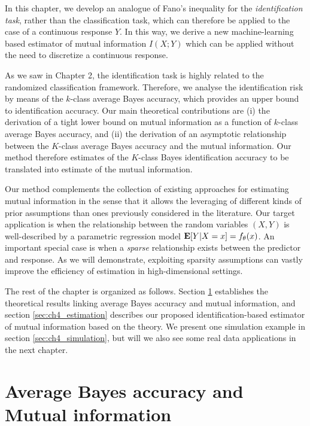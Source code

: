 In this chapter, we develop an analogue of Fano's inequality for the
\emph{identification task}, rather than the classification task, which
can therefore be applied to the case of a continuous response $Y$.  In
this way, we derive a new machine-learning based estimator of mutual
information $I(X; Y)$ which can be applied without the need to
discretize a continuous response.

As we saw in Chapter 2, the identification task is highly related to
the randomized classification framework.  Therefore, we analyse the
identification risk by means of the $k$-class average Bayes accuracy,
which provides an upper bound to identification accuracy.  Our main
theoretical contributions are (i) the derivation of a tight lower
bound on mutual information as a function of $k$-class average Bayes
accuracy, and (ii) the derivation of an asymptotic relationship
between the $K$-class average Bayes accuracy and the mutual
information. Our method therefore estimates of the $K$-class Bayes
identification accuracy to be translated into estimate of the mutual
information.

Our method complements the collection of existing approaches for
estimating mutual information in the sense that it allows the
leveraging of different kinds of prior assumptions than ones
previously considered in the literature.  Our target application is
when the relationship between the random variables $(X, Y)$ is
well-described by a parametric regression model $\textbf{E}[Y|X=x] =
f_\theta(x)$.  An important special case is when a \emph{sparse}
relationship exists between the predictor and response.  As we will
demonstrate, exploiting sparsity assumptions can vastly improve the
efficiency of estimation in high-dimensional settings.

The rest of the chapter is organized as follows.  Section
\ref{sec:ch4_theory} establishes the theoretical results linking
average Bayes accuracy and mutual information, and section
\ref{sec:ch4_estimation} describes our proposed identification-based
estimator of mutual information based on the theory.  We present one
simulation example in section \ref{sec:ch4_simulation}, but will we
also see some real data applications in the next chapter.

\section{Average Bayes accuracy and Mutual information}\label{sec:ch4_theory}

